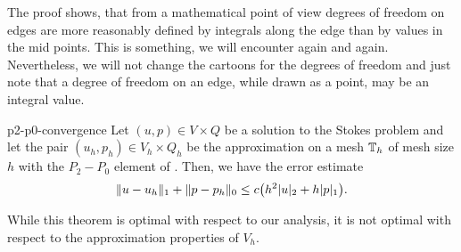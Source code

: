 \begin{remark}
  The proof shows, that from a mathematical point of view degrees of
  freedom on edges are more reasonably defined by integrals along the
  edge than by values in the mid points. This is something, we will
  encounter again and again. Nevertheless, we will not change the
  cartoons for the degrees of freedom and just note that a degree of
  freedom on an edge, while drawn as a point, may be an integral value.
\end{remark}

\begin{Theorem}{p2-p0-convergence}
  Let $(u,p)\in V\times Q$ be a solution to the Stokes problem and let
  the pair $(u_h,p_h) \in V_h\times Q_h$ be the approximation on a
  mesh $\mathbb T_h$ of mesh size $h$ with the $P_2-P_0$ element of
  . Then, we have the error
  estimate
  \begin{gather*}
    \lVert u-u_h\rVert_1 + \lVert p-p_h\rVert_0
    \le c \bigl(h^2\lvert u\rvert_2 + h \lvert p\rvert_1\bigr).
  \end{gather*}
\end{Theorem}

\begin{remark}
  While this theorem is optimal with respect to our analysis, it is
  not optimal with respect to the approximation properties of $V_h$.
\end{remark}

